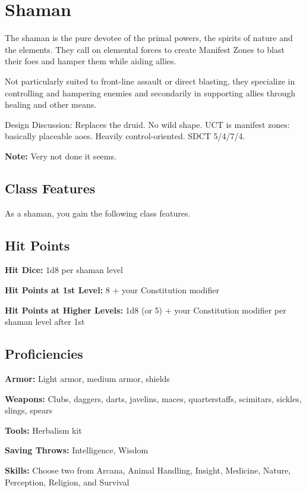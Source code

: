 \section{Shaman\label{class:shaman}}

The shaman is the pure devotee of the primal powers, the spirits of nature and the elements. They call on elemental forces to create Manifest Zones to blast their foes and hamper them while aiding allies.

Not particularly suited to front-line assault or direct blasting, they specialize in controlling and hampering enemies and secondarily in supporting allies through healing and other means.

Design Discussion: Replaces the druid. No wild shape. UCT is manifest zones: basically placeable aoes. Heavily control-oriented. SDCT 5/4/7/4.

\textbf{Note:} Very not done it seems.

\subsection{Class Features}

As a shaman, you gain the following class features.

\subsection{Hit Points}

\textbf{Hit Dice:} 1d8 per shaman level

\textbf{Hit Points at 1st Level:} 8 + your Constitution modifier

\textbf{Hit Points at Higher Levels:} 1d8 (or 5) + your Constitution modifier per shaman level after 1st

\subsection{Proficiencies}

\textbf{Armor:} Light armor, medium armor, shields

\textbf{Weapons:} Clubs, daggers, darts, javelins, maces, quarterstaffs, scimitars, sickles, slings, spears

\textbf{Tools:} Herbalism kit

\textbf{Saving Throws:} Intelligence, Wisdom

\textbf{Skills:} Choose two from Arcana, Animal Handling, Insight, Medicine, Nature, Perception, Religion, and Survival

